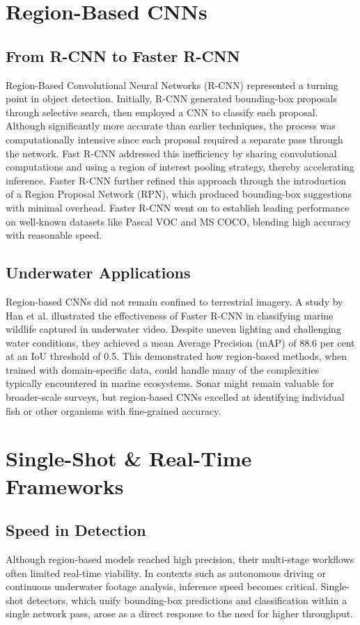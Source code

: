 \section{Region-Based CNNs}
\subsection{From R-CNN to Faster R-CNN}
Region-Based Convolutional Neural Networks (R-CNN) represented a turning point in object detection. Initially, R-CNN generated bounding-box proposals through selective search, then employed a CNN to classify each proposal. Although significantly more accurate than earlier techniques, the process was computationally intensive since each proposal required a separate pass through the network. Fast R-CNN addressed this inefficiency by sharing convolutional computations and using a region of interest pooling strategy, thereby accelerating inference. Faster R-CNN further refined this approach through the introduction of a Region Proposal Network (RPN), which produced bounding-box suggestions with minimal overhead. Faster R-CNN went on to establish leading performance on well-known datasets like Pascal VOC and MS COCO, blending high accuracy with reasonable speed.

\subsection{Underwater Applications}
Region-based CNNs did not remain confined to terrestrial imagery. A study by Han et al. illustrated the effectiveness of Faster R-CNN in classifying marine wildlife captured in underwater video. Despite uneven lighting and challenging water conditions, they achieved a mean Average Precision (mAP) of 88.6 per cent at an IoU threshold of 0.5. This demonstrated how region-based methods, when trained with domain-specific data, could handle many of the complexities typically encountered in marine ecosystems. Sonar might remain valuable for broader-scale surveys, but region-based CNNs excelled at identifying individual fish or other organisms with fine-grained accuracy.

\section{Single-Shot \& Real-Time Frameworks}
\subsection{Speed in Detection}
Although region-based models reached high precision, their multi-stage workflows often limited real-time viability. In contexts such as autonomous driving or continuous underwater footage analysis, inference speed becomes critical. Single-shot detectors, which unify bounding-box predictions and classification within a single network pass, arose as a direct response to the need for higher throughput.
